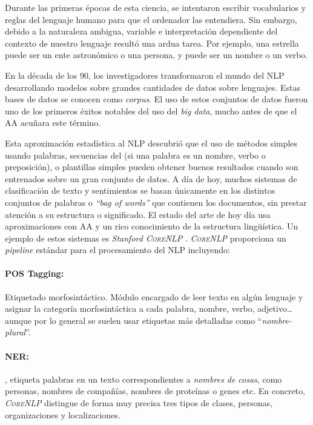 Durante las primeras épocas de esta ciencia, se intentaron escribir vocabularios
y reglas del lenguaje humano para que el ordenador las entendiera. Sin embargo,
debido a la naturaleza ambigua, variable e interpretación dependiente del
contexto de nuestro lenguaje resultó una ardua tarea. Por ejemplo, una estrella
puede ser un ente astronómico o una persona, y puede ser un nombre o un verbo.

En la década de los 90, los investigadores transformaron el mundo del \ac{NLP}
desarrollando modelos sobre grandes cantidades de datos sobre lenguajes. Estas
bases de datos se conocen como \emph{corpus}. El uso de estos conjuntos de datos
fueron uno de los primeros éxitos notables del uso del \emph{big data}, mucho
antes de que el \ac{AA} acuñara este término.

Esta aproximación estadística al \ac{NLP} descubrió que el uso de métodos
simples usando palabras, secuencias del
 (si una palabra es un nombre, verbo o preposición), o plantillas
simples pueden obtener buenos resultados cuando son entrenados sobre un gran
conjunto de datos. A día de hoy, muchos sistemas de clasificación de texto y
sentimientos se basan únicamente en los distintos conjuntos de palabras o
\emph{``bag of words''} que contienen los documentos, sin prestar atención a su
estructura o significado. El estado del arte de hoy día usa aproximaciones con
\ac{AA} y un rico conocimiento de la estructura lingüística. Un ejemplo de estos
sistemas es \emph{Stanford \textsc{CoreNLP}} \citep{Manning2014}. \emph{\textsc{CoreNLP}}
proporciona un \emph{pipeline} estándar para el procesamiento del \ac{NLP}
incluyendo:

\paragraph{POS Tagging:}Etiquetado morfosintáctico. Módulo encargado de leer
texto en algún lenguaje y asignar la categoría morfosintáctica a cada palabra,
\eg nombre, verbo, adjetivo\dots aunque por lo general se suelen usar etiquetas
más detalladas como ``\emph{nombre-plural}''.

\paragraph{NER:}, etiqueta palabras en un texto
correspondientes a \emph{nombres de cosas}, como personas, nombres de compañías,
nombres de proteínas o genes etc. En concreto, \emph{\textsc{CoreNLP}} distingue de forma
muy precisa tres tipos de clases, personas, organizaciones y localizaciones.

